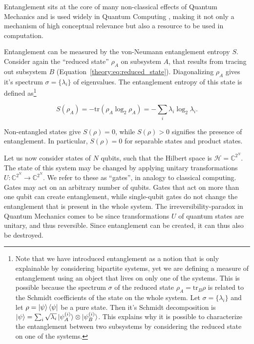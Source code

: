 \documentclass[reprint,amsmath,amssymb,aps,prb,nofootinbib]{revtex4-2}
\begin{document}
    Entanglement sits at the core of many non-classical effects of Quantum Mechanics \cite{Einstein:1935:EPR} and
    is used widely in Quantum Computing \cite{Harrow:2009:hhlAlgorithm,Shor:1997:PolyTimeFactorizing}, making it
    not only a mechanism of high conceptual relevance but also a resource to be used in computation.

    Entanglement can be measured by the von-Neumann entanglement entropy $S$. Consider again the ``reduced state''
    $\rho_A$ on subsystem $A$, that results from tracing out subsystem $B$ (Equation~\ref{theory:eq:reduced_state}).
    Diagonalizing $\rho_A$ gives it's spectrum $\sigma=\{\lambda_i\}$ of eigenvalues. The entanglement entropy of
    this state is defined as\footnote{Note that we have introduced entanglement as a notion that is only explainable
    by considering bipartite systems, yet we are defining a measure of entanglement using an object that lives on
    only one of the systems. This is possible because the spectrum $\sigma$ of the reduced state $\rho_A=\text{tr}_B\rho$
    is related to the Schmidt coefficients of the state on the whole system. Let $\sigma=\{\lambda_i\}$ and let
    $\rho=\ket{\psi}\bra{\psi}$ be a pure state. Then it's Schmidt decomposition is
    $\ket{\psi}=\sum_i\sqrt{\lambda_i}\ket{\psi_A^{(i)}}\otimes\ket{\psi_B^{(i)}}$. This explains why it is possible to
    characterize the entanglement between two subsystems by considering the reduced state on one of the systems.}

    \begin{equation}
        S(\rho_A) = -\text{tr}\left(\rho_A\log_2\rho_A\right) = -\sum_i\lambda_i\log_2\lambda_i.
    \end{equation}

    Non-entangled states give $S(\rho)=0$, while $S(\rho)>0$ signifies the presence of entanglement. In particular,
    $S(\rho)=0$ for separable states and product states.

    \vspace{\baselineskip}

    Let us now consider states of $N$ qubits, such that the Hilbert space is $\mathcal{H}=\mathbb{C}^{2^N}$. The state of this system may be changed by applying unitary transformations
    $U:\mathbb{C}^{2^N}\rightarrow\mathbb{C}^{2^N}$. We refer to these as ``gates'', in analogy to classical
    computing. Gates may act on an arbitrary number of qubits. Gates that act on more than one qubit can create
    entanglement, while single-qubit gates do not change the entanglement that is present in the whole system.
    The irreversibility-paradox in Quantum Mechanics comes to be since transformations $U$ of quantum states are
    unitary, and thus reversible. Since entanglement can be created, it can thus also be destroyed.
\end{document}
